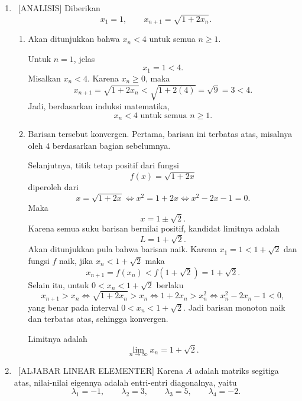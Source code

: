 \documentclass[10pt,a4paper]{article}
\begin{document}
\begin{enumerate}
  \item \ [ANALISIS]
        Diberikan
        \[
          x_1=1,\qquad x_{n+1}=\sqrt{1+2x_n}.
        \]
        \begin{enumerate}
          \item Akan ditunjukkan bahwa $x_n<4$ untuk semua $n\geq 1$.

                Untuk $n=1$, jelas
                \[
                  x_1=1<4.
                \]
                Misalkan $x_n<4$. Karena $x_n\geq 0$, maka
                \[
                  x_{n+1}=\sqrt{1+2x_n}
                  < \sqrt{1+2(4)}
                  = \sqrt{9}
                  =3<4.
                \]
                Jadi, berdasarkan induksi matematika,
                \[
                  \boxed{x_n<4 \text{ untuk semua } n\geq 1.}
                \]

          \item Barisan tersebut konvergen. Pertama, barisan ini terbatas atas, misalnya oleh $4$ berdasarkan bagian sebelumnya.

                Selanjutnya, titik tetap positif dari fungsi
                \[
                  f(x)=\sqrt{1+2x}
                \]
                diperoleh dari
                \[
                  x=\sqrt{1+2x}
                  \iff x^2=1+2x
                  \iff x^2-2x-1=0.
                \]
                Maka
                \[
                  x=1\pm \sqrt{2}.
                \]
                Karena semua suku barisan bernilai positif, kandidat limitnya adalah
                \[
                  L=1+\sqrt{2}.
                \]
                Akan ditunjukkan pula bahwa barisan naik. Karena $x_1=1<1+\sqrt{2}$ dan fungsi $f$ naik, jika $x_n<1+\sqrt{2}$ maka
                \[
                  x_{n+1}=f(x_n)<f(1+\sqrt{2})=1+\sqrt{2}.
                \]
                Selain itu, untuk $0<x_n<1+\sqrt{2}$ berlaku
                \[
                  x_{n+1}>x_n
                  \iff \sqrt{1+2x_n}>x_n
                  \iff 1+2x_n>x_n^2
                  \iff x_n^2-2x_n-1<0,
                \]
                yang benar pada interval $0<x_n<1+\sqrt{2}$. Jadi barisan monoton naik dan terbatas atas, sehingga konvergen.

                Limitnya adalah
                \[
                  \boxed{\lim_{n\to\infty}x_n=1+\sqrt{2}.}
                \]
        \end{enumerate}

  \item \ [ALJABAR LINEAR ELEMENTER]
        Karena $A$ adalah matriks segitiga atas, nilai-nilai eigennya adalah entri-entri diagonalnya, yaitu
        \[
          \lambda_1=-1,\qquad \lambda_2=3,\qquad \lambda_3=5,\qquad \lambda_4=-2.
        \]


\end{enumerate}
\end{document}
